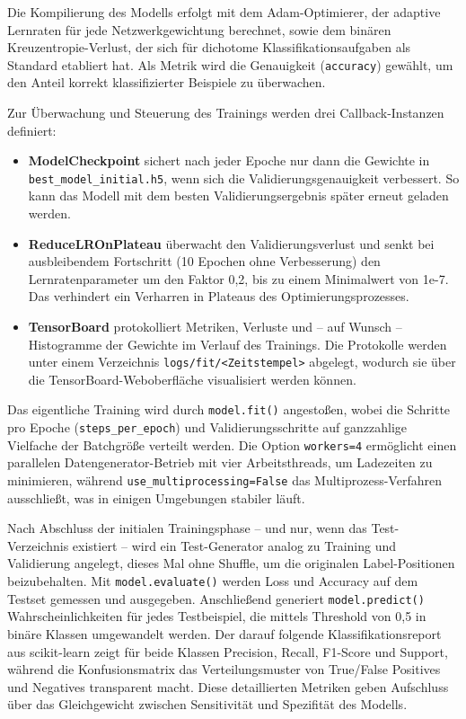 Die Kompilierung des Modells erfolgt mit dem Adam-Optimierer, der adaptive Lernraten für jede Netzwerkgewichtung berechnet, sowie dem binären Kreuzentropie-Verlust, der sich für dichotome Klassifikationsaufgaben als Standard etabliert hat. Als Metrik wird die Genauigkeit (\texttt{accuracy}) gewählt, um den Anteil korrekt klassifizierter Beispiele zu überwachen.

Zur Überwachung und Steuerung des Trainings werden drei Callback-Instanzen definiert:
\begin{itemize}
  \item \textbf{ModelCheckpoint} sichert nach jeder Epoche nur dann die Gewichte in \texttt{best\_model\_initial.h5}, wenn sich die Validierungsgenauigkeit verbessert. So kann das Modell mit dem besten Validierungsergebnis später erneut geladen werden.
  \item \textbf{ReduceLROnPlateau} überwacht den Validierungsverlust und senkt bei ausbleibendem Fortschritt (10 Epochen ohne Verbesserung) den Lernratenparameter um den Faktor 0,2, bis zu einem Minimalwert von 1e-7. Das verhindert ein Verharren in Plateaus des Optimierungsprozesses.
  \item \textbf{TensorBoard} protokolliert Metriken, Verluste und – auf Wunsch – Histogramme der Gewichte im Verlauf des Trainings. Die Protokolle werden unter einem Verzeichnis \texttt{logs/fit/<Zeitstempel>} abgelegt, wodurch sie über die TensorBoard-Weboberfläche visualisiert werden können.
\end{itemize}

Das eigentliche Training wird durch \texttt{model.fit()} angestoßen, wobei die Schritte pro Epoche (\texttt{steps\_per\_epoch}) und Validierungsschritte auf ganzzahlige Vielfache der Batchgröße verteilt werden. Die Option \texttt{workers=4} ermöglicht einen parallelen Datengenerator-Betrieb mit vier Arbeitsthreads, um Ladezeiten zu minimieren, während \texttt{use\_multiprocessing=False} das Multiprozess-Verfahren ausschließt, was in einigen Umgebungen stabiler läuft.

Nach Abschluss der initialen Trainingsphase – und nur, wenn das Test-Verzeichnis existiert – wird ein Test-Generator analog zu Training und Validierung angelegt, dieses Mal ohne Shuffle, um die originalen Label-Positionen beizubehalten. Mit \texttt{model.evaluate()} werden Loss und Accuracy auf dem Testset gemessen und ausgegeben. Anschließend generiert \texttt{model.predict()} Wahrscheinlichkeiten für jedes Testbeispiel, die mittels Threshold von 0,5 in binäre Klassen umgewandelt werden. Der darauf folgende Klassifikationsreport aus scikit-learn zeigt für beide Klassen Precision, Recall, F1-Score und Support, während die Konfusionsmatrix das Verteilungsmuster von True/False Positives und Negatives transparent macht. Diese detaillierten Metriken geben Aufschluss über das Gleichgewicht zwischen Sensitivität und Spezifität des Modells.

